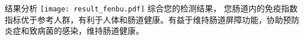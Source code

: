 \vspace*{6mm}
\begin{spacing}{1.5}
\begin{LRaside}[.8]{结果分析}
\noindent
\texttt{[image: result\_fenbu.pdf]}
\asidebreak %
综合您的检测结果，
您肠道内的免疫指数指标优于参考人群，有利于人体和肠道健康。有益于维持肠道屏障功能，协助预防炎症和致病菌的感染，维持肠道健康。
\end{LRaside}
\end{spacing}



